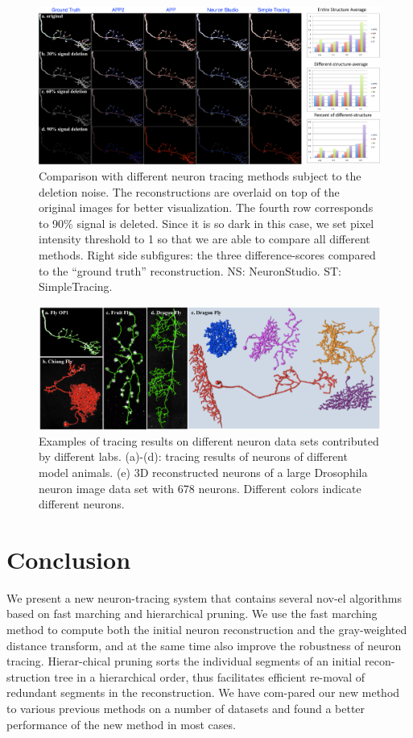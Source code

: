 \begin{figure}[htbp]
\centering
\includegraphics[width=1.0\textwidth]{images/autont_fig3}
\caption[Comparison with different neuron tracing methods subject to the deletion noise]{Comparison with different neuron tracing methods subject to the deletion noise. The reconstructions are overlaid on top of the original images for better visualization. The fourth row corresponds to 90\% signal is deleted. Since it is so dark in this case, we set pixel intensity threshold to 1 so that we are able to compare all different methods. Right side subfigures: the three difference-scores compared to the “ground truth” reconstruction. NS: NeuronStudio. ST: SimpleTracing.}
\label{fig:autont-fig3}
\end{figure}

\begin{figure}[htbp]
\centering
\includegraphics[width=1.0\textwidth]{images/autont_fig4}
\caption[Examples of tracing results on different neuron data sets contributed by different labs]{Examples of tracing results on different neuron data sets contributed by different labs. (a)-(d): tracing results of neurons of different model animals. (e) 3D reconstructed neurons of a large Drosophila neuron image data set with 678 neurons. Different colors indicate different neurons.}
\label{fig:autont-fig4}
\end{figure}

\section{Conclusion}
We present a new neuron-tracing system that contains several nov-el algorithms based on fast marching and hierarchical pruning. We use the fast marching method to compute both the initial neuron reconstruction and the gray-weighted distance transform, and at the same time also improve the robustness of neuron tracing. Hierar-chical pruning sorts the individual segments of an initial recon-struction tree in a hierarchical order, thus facilitates efficient re-moval of redundant segments in the reconstruction. We have com-pared our new method to various previous methods on a number of datasets and found a better performance of the new method in most cases. 
